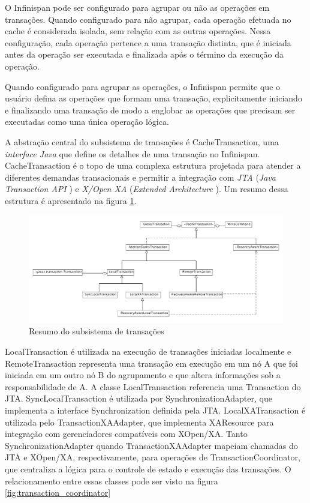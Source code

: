 \documentclass[11pt,twoside,a4paper]{book}
\begin{document}
O Infinispan pode ser configurado para agrupar ou não as operações em transações. Quando configurado para não agrupar, cada operação efetuada no cache é considerada isolada, sem relação com as outras operações. Nessa configuração, cada operação pertence a uma transação distinta, que é iniciada antes da operação ser executada e finalizada após o término da execução da operação.

Quando configurado para agrupar as operações, o Infinispan permite que o usuário defina as operações que formam uma transação, explicitamente iniciando e finalizando uma transação de modo a englobar as operações que precisam ser executadas como uma única operação lógica.

A abstração central do subsistema de transações é CacheTransaction, uma \emph{interface Java} \cite{java} que define os detalhes de uma transação no Infinispan. CacheTransaction é o topo de uma complexa estrutura projetada para atender a diferentes demandas transacionais e permitir a integração com \emph{JTA} (\emph{Java Transaction API} \cite{jta}) e \emph{X/Open XA} (\emph{Extended Architecture} \cite{xa}). Um resumo dessa estrutura é apresentado na figura \ref{fig:subsistema_transacoes}.

\begin{figure}
  \centering
  \includegraphics[width=\textwidth]{subsistema_transacoes} 
  \caption{Resumo do subsistema de transações}
  \label{fig:subsistema_transacoes} 
\end{figure}

LocalTransaction é utilizada na execução de transações iniciadas localmente e RemoteTransaction representa uma transação em execução em um nó A que foi iniciada em um outro nó B do agrupamento e que altera informações sob a responsabilidade de A. A classe LocalTransaction referencia uma Transaction do JTA. SyncLocalTransaction é utilizada por SynchronizationAdapter, que implementa a interface Synchronization definida pela JTA. LocalXATransaction é utilizada pelo TransactionXAAdapter, que implementa XAResource para integração com gerenciadores compatíveis com XOpen/XA. Tanto SynchronizationAdapter quando TransactionXAAdapter mapeiam chamadas do JTA e XOpen/XA, respectivamente, para operações de TransactionCoordinator, que centraliza a lógica para o controle de estado e execução das transações. O relacionamento entre essas classes pode ser visto na figura \ref{fig:transaction_coordinator}
\end{document}
